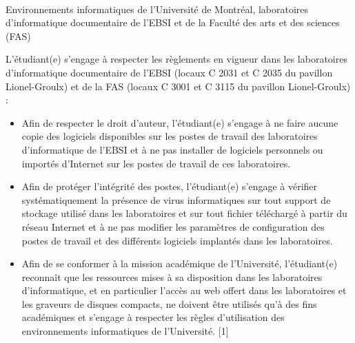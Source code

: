 \documentclass [12 pt]{article}
\begin{document}
             
            
                
                    Environnements informatiques de l'Université de Montréal, laboratoires
                        d'informatique documentaire de l'EBSI et de la Faculté des arts et des
                        sciences (FAS)
                
            
            L'étudiant(e) s'engage à respecter les règlements en vigueur dans les laboratoires
                d'informatique documentaire de l'EBSI (locaux C 2031 et C 2035 du pavillon
                Lionel-Groulx) et de la FAS (locaux C 3001 et C 3115 du pavillon Lionel-Groulx)
                :
            
        \begin{itemize}
        
                
        \item Afin de respecter le droit d'auteur, l'étudiant(e) s'engage à
                    ne faire aucune copie des logiciels disponibles sur les postes de travail des
                    laboratoires d'informatique de l'EBSI et à ne pas installer de logiciels
                    personnels ou importés d'Internet sur les postes de travail de ces
                    laboratoires.
                
        \item Afin de protéger l'intégrité des postes, l'étudiant(e) s'engage
                    à vérifier systématiquement la présence de virus informatiques sur tout support
                    de stockage utilisé dans les laboratoires et sur tout fichier téléchargé à
                    partir du réseau Internet et à ne pas modifier les paramètres de configuration
                    des postes de travail et des différents logiciels implantés dans les
                    laboratoires.
                
        \item Afin de se conformer à la mission académique de l'Université,
                    l'étudiant(e) reconnaît que les ressources mises à sa disposition dans les
                    laboratoires d'informatique, et en particulier l'accès au web offert dans les
                    laboratoires et les graveurs de disques compacts, ne doivent être utilisés qu'à
                    des fins académiques et s'engage à respecter les règles d'utilisation des
                    environnements informatiques de l'Université. [1]
            
        \end{itemize}
    
\end{document}
